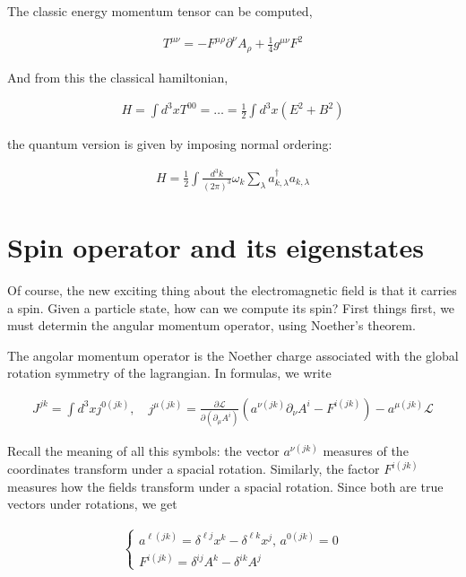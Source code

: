 \documentclass{report}
\begin{document}
The classic energy momentum tensor can be computed, 

\begin{align}
    T^{\mu\nu} = -F^{\mu\rho}\partial^\nu A_\rho + \frac{1}{4}g^{\mu\nu}F^2
\end{align}

And from this the classical hamiltonian, 

\begin{align}
    H = \int d^3x T^{00} = \ldots = \frac{1}{2}\int d^3x (E^2 + B^2)
\end{align}

the quantum version is given by imposing normal ordering: 

\begin{align}
    H = \frac{1}{2}\int \frac{d^3k}{(2\pi)^3}\omega_k \sum_{\lambda}a^\dagger_{k, \lambda}a_{k, \lambda}
\end{align}

\section{Spin operator and its eigenstates}

Of course, the new exciting thing about the electromagnetic field is that it carries a spin. Given a particle state, how can we compute its spin? First things first, we must determin the angular momentum operator, using Noether's theorem. 

The angolar momentum operator is the Noether charge associated with the global rotation symmetry of the lagrangian. In formulas, we write 

\begin{align}
    J^{jk} = \int d^3x j^{0(jk)}, \quad j^{\mu (jk)} = \frac{\partial\mathcal{L}}{\partial(\partial_\mu A^i)}(a^{\nu(jk)}\partial_\nu A^i - F^{i(jk)}) - a^{\mu(jk)}\mathcal{L}
\end{align}

Recall the meaning of all this symbols: the vector \(a^{\nu(jk)}\) measures of the coordinates transform under a spacial rotation. Similarly, the factor \(F^{i(jk)}\) measures how the fields transform under a spacial rotation. Since both are true vectors under rotations, we get 

\begin{align}
    \begin{cases}
        a^{\ell(jk)} = \delta^{\ell j}x^k - \delta^{\ell k}x^j, \, a^{0(jk)} = 0 \\
        F^{i(jk)} = \delta^{ij}A^k - \delta^{ik}A^j
    \end{cases}
\end{align}
\end{document}
